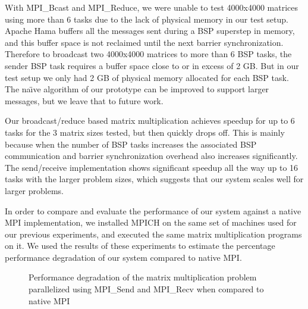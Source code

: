 \documentclass[conference,10pt] {IEEEtran}
\begin{document}
With MPI\_Bcast and MPI\_Reduce, we were unable to test 4000x4000 matrices using
more than 6 tasks due to the lack of physical memory in our test setup. Apache
Hama buffers all the messages sent during a BSP superstep in memory, and this
buffer space is not reclaimed until the next barrier synchronization. Therefore
to broadcast two 4000x4000 matrices to more than 6 BSP tasks, the sender BSP
task requires a buffer space close to or in excess of 2 GB. But in our test
setup we only had 2 GB of physical memory allocated for each BSP task. The
na\"{\i}ve algorithm of our prototype can be improved to support larger
messages, but we leave that to future work.

Our broadcast/reduce based matrix multiplication achieves speedup for up to 6
tasks for the 3 matrix sizes tested, but then quickly drops off. This is mainly
because when the number of BSP tasks increases the associated BSP communication
and barrier synchronization overhead also increases significantly. The
send/receive implementation shows significant speedup all the way up to 16
tasks with the larger problem sizes, which suggests that our system scales
well for larger problems.

In order to compare and evaluate the performance of our system against a native MPI implementation, we installed MPICH \cite{url:mpich} on the same set of machines used for our previous experiments, and executed the same matrix multiplication programs on it. We used the results of these experiments to estimate the percentage performance degradation of our system compared to native MPI.

\begin{figure}[t]
  \centering
  \caption{Performance degradation of the matrix multiplication problem parallelized using MPI\_Send and MPI\_Recv when compared to native MPI}
  \label{fig-mm3}
\end{figure}
\end{document}
